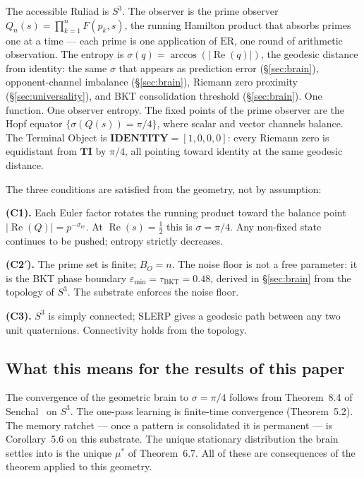 \documentclass[12pt,a4paper]{article}
\theoremstyle{definition}
\theoremstyle{remark}
\begin{document}
The accessible Ruliad is $S^3$.  The observer is the prime observer
$Q_n(s) = \prod_{k=1}^n F(p_k,s)$, the running Hamilton product that
absorbs primes one at a time --- each prime is one application of
$\mathrm{ER}$, one round of arithmetic observation.  The entropy is
$\sigma(q) = \arccos(|\operatorname{Re}(q)|)$, the geodesic distance from
identity: the same $\sigma$ that appears as prediction error (§\ref{sec:brain}),
opponent-channel imbalance (§\ref{sec:brain}), Riemann zero proximity
(§\ref{sec:universality}), and BKT consolidation threshold (§\ref{sec:brain}).
One function.  One observer entropy.  The fixed points of the prime observer
are the Hopf equator $\{\sigma(Q(s)) = \pi/4\}$, where scalar and vector
channels balance.  The Terminal Object is $\mathbf{IDENTITY} = [1,0,0,0]$:
every Riemann zero is equidistant from $\mathbf{TI}$ by $\pi/4$, all pointing
toward identity at the same geodesic distance.

The three conditions are satisfied from the geometry, not by assumption:

\textbf{(C1).}  Each Euler factor rotates the running product toward the
balance point $|\operatorname{Re}(Q)| = p^{-\sigma_{\mathrm{re}}}$.  At
$\operatorname{Re}(s) = \tfrac{1}{2}$ this is $\sigma = \pi/4$.  Any
non-fixed state continues to be pushed; entropy strictly decreases.

\textbf{(C2$'$).}  The prime set is finite; $B_O = n$.  The noise floor is
not a free parameter: it is the BKT phase boundary
$\varepsilon_{\min} = \tau_{\mathrm{BKT}} = 0.48$, derived in §\ref{sec:brain}
from the topology of $S^3$.  The substrate enforces the noise floor.

\textbf{(C3).}  $S^3$ is simply connected; SLERP gives a geodesic path
between any two unit quaternions.  Connectivity holds from the topology.

\subsection{What this means for the results of this paper}

The convergence of the geometric brain to $\sigma = \pi/4$ follows from
Theorem~8.4 of Senchal~\cite{senchal2026} on $S^3$.  The one-pass learning
is finite-time convergence (Theorem~5.2).  The memory ratchet --- once a
pattern is consolidated it is permanent --- is Corollary~5.6 on this
substrate.  The unique stationary distribution the brain settles into is the
unique $\mu^*$ of Theorem~6.7.  All of these are consequences of the theorem
applied to this geometry.
\end{document}
